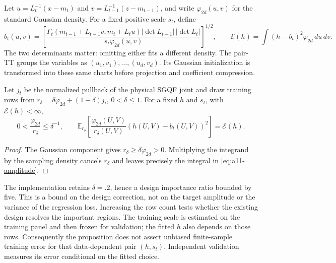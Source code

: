 Let $u=L_t^{-1}(x-m_t)$ and
$v=L_{t-1}^{-1}(z-m_{t-1})$, and write $\varphi_{2d}(u,v)$ for the
standard Gaussian density. For a fixed positive scale $s_t$, define
\begin{equation}
 b_t(u,v)=\left[
 \frac{\Gamma_t(m_{t-1}+L_{t-1}v,m_t+L_tu)
       |\det L_{t-1}|\,|\det L_t|}
      {s_t\varphi_{2d}(u,v)}\right]^{1/2},\qquad
 \mathcal E(h)=\int(h-b_t)^2\varphi_{2d}\,du\,dv.
 \label{eq:a11-amplitude}
\end{equation}
The two determinants matter: omitting either fits a different density.
The pair-TT groups the variables as $(u_1,v_1),\ldots,(u_d,v_d)$.
Its Gaussian initialization is transformed into these same charts before
projection and coefficient compression.

\begin{proposition}
\label{prop:a11-design}
Let $j_t$ be the normalized pullback of the physical SGQF joint and draw
training rows from $r_\delta=\delta\varphi_{2d}+(1-\delta)j_t$,
$0<\delta\le1$. For a fixed $h$ and $s_t$, with $\mathcal E(h)<\infty$,
\begin{equation}
 0<\frac{\varphi_{2d}}{r_\delta}\le\delta^{-1},\qquad
 \mathbb E_{r_\delta}\left[
 \frac{\varphi_{2d}(U,V)}{r_\delta(U,V)}
       (h(U,V)-b_t(U,V))^2\right]=\mathcal E(h).
 \label{eq:a11-design}
\end{equation}
\end{proposition}
\begin{proof}
The Gaussian component gives $r_\delta\ge\delta\varphi_{2d}>0$.
Multiplying the integrand by the sampling density cancels $r_\delta$
and leaves precisely the integral in \eqref{eq:a11-amplitude}.
\end{proof}

The implementation retains $\delta=.2$, hence a design importance ratio
bounded by five. This is a bound on the design correction, not on the target
amplitude or the variance of the regression loss. Increasing the row count
tests whether the existing design resolves the important regions. The
training scale is estimated on the training panel and then frozen for
validation; the fitted $h$ also depends on those rows. Consequently the
proposition does not assert unbiased finite-sample training error for that
data-dependent pair $(h,s_t)$. Independent validation measures its error
conditional on the fitted choice.

